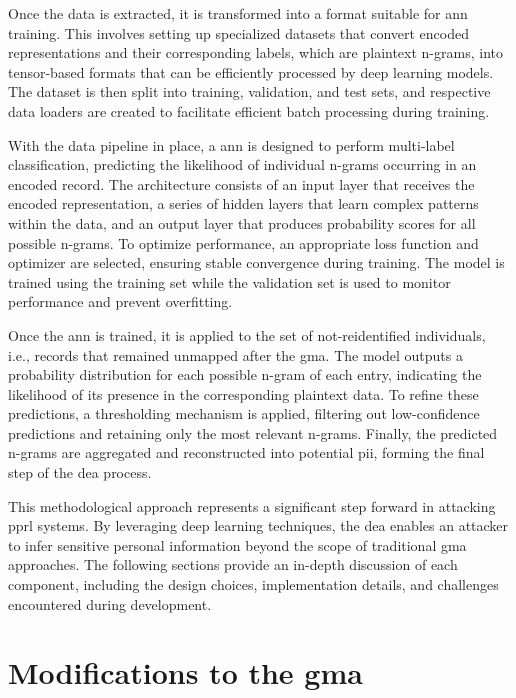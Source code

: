 Once the data is extracted, it is transformed into a format suitable for \ac{ann} training.
This involves setting up specialized datasets that convert encoded representations and their corresponding labels, which are plaintext n-grams, into tensor-based formats that can be efficiently processed by deep learning models.
The dataset is then split into training, validation, and test sets, and respective data loaders are created to facilitate efficient batch processing during training.

With the data pipeline in place, a \ac{ann} is designed to perform multi-label classification, predicting the likelihood of individual n-grams occurring in an encoded record.
The architecture consists of an input layer that receives the encoded representation, a series of hidden layers that learn complex patterns within the data, and an output layer that produces probability scores for all possible n-grams.
To optimize performance, an appropriate loss function and optimizer are selected, ensuring stable convergence during training.
The model is trained using the training set while the validation set is used to monitor performance and prevent overfitting.

Once the \ac{ann} is trained, it is applied to the set of not-reidentified individuals, i.e., records that remained unmapped after the \ac{gma}.
The model outputs a probability distribution for each possible n-gram of each entry, indicating the likelihood of its presence in the corresponding plaintext data.
To refine these predictions, a thresholding mechanism is applied, filtering out low-confidence predictions and retaining only the most relevant n-grams.
Finally, the predicted n-grams are aggregated and reconstructed into potential \ac{pii}, forming the final step of the \ac{dea} process.

This methodological approach represents a significant step forward in attacking \ac{pprl} systems.
By leveraging deep learning techniques, the \ac{dea} enables an attacker to infer sensitive personal information beyond the scope of traditional \ac{gma} approaches.
The following sections provide an in-depth discussion of each component, including the design choices, implementation details, and challenges encountered during development.

\section{Modifications to the \ac{gma}} \label{sec:modifications}

